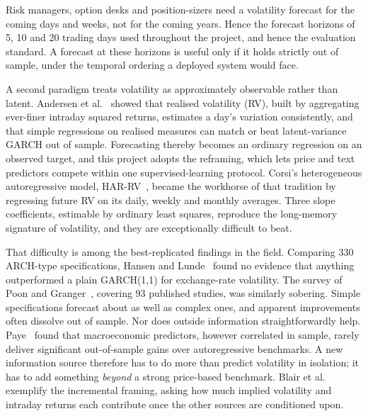 Risk managers, option desks and position-sizers need a volatility forecast for the coming days and weeks, not for the coming years. Hence the forecast horizons of 5, 10 and 20 trading days used throughout the project, %
and hence the evaluation standard. A forecast at these horizons is useful only if it holds strictly out of sample, under the temporal ordering a deployed system would face.

A second paradigm treats volatility as approximately observable rather than latent. Andersen et al.~\cite{andersen2003modeling} showed that realised volatility (RV), built by aggregating ever-finer intraday squared returns, estimates a day's variation consistently, and that simple regressions on realised measures can match or beat latent-variance GARCH out of sample. Forecasting thereby becomes an ordinary regression on an observed target, and this project adopts the reframing, which lets price and text predictors compete within one supervised-learning protocol. Corsi's heterogeneous autoregressive model, HAR-RV~\cite{corsi2009har}, became the workhorse of that tradition by regressing future RV on its daily, weekly and monthly averages. Three slope coefficients, %
estimable by ordinary least squares, reproduce the long-memory signature of volatility, and they are exceptionally difficult to beat.

That difficulty is among the best-replicated findings in the field. Comparing 330 ARCH-type specifications, %
Hansen and Lunde~\cite{hansen2005garch} found no evidence that anything outperformed a plain GARCH(1,1) for exchange-rate volatility. The survey of Poon and Granger~\cite{poon2003forecasting}, covering 93 published studies, %
was similarly sobering. Simple specifications forecast about as well as complex ones, and apparent improvements often dissolve out of sample. Nor does outside information straightforwardly help. Paye~\cite{paye2012dejavol} found that macroeconomic predictors, however correlated in sample, rarely deliver significant out-of-sample gains over autoregressive benchmarks. A new information source therefore has to do more than predict volatility in isolation; it has to add something \emph{beyond} a strong price-based benchmark. Blair et al.~\cite{blair2001forecasting} exemplify the incremental framing, asking how much implied volatility and intraday returns each contribute once the other sources are conditioned upon.


